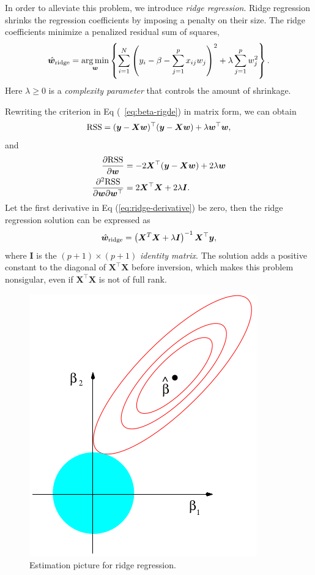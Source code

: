 In order to alleviate this problem, we introduce \emph{ridge regression}. Ridge regression shrinks the regression coefficients by imposing a penalty 
on their size. The ridge coefficients minimize a penalized residual sum of squares,
\begin{equation}\label{eq:beta-rigde}
    \hat{\bm{w}}_{\text{ridge}} = \mathop{\arg\min}_{\bm{w}} \left\{
        \sum_{i=1}^N \left(
            y_i - \beta - \sum_{j=1}^p x_{ij} w_j 
        \right)^2 + \lambda \sum_{j=1}^p w_j^2
    \right\}. 
\end{equation}
Here \(\lambda \ge 0\) is a \emph{complexity parameter} that controls the amount of shrinkage.

Rewriting the criterion in Eq (~\ref{eq:beta-rigde}) in matrix form, we can obtain
\begin{equation}
    \mathrm{RSS} = (\bm{y} - \bm{Xw})^\top (\bm{y} - \bm{Xw}) + \lambda \bm{w}^\top \bm{w},
\end{equation}
and
\begin{equation}\label{eq:ridge-derivative}
    \begin{aligned}
        \pdv{\mathrm{RSS}}{\bm{w}} &= -2\bm{X}^\top (\bm{y} - \bm{Xw}) + 2\lambda\bm{w}\\
        \pdv{\mathrm{RSS}}{\bm{w}}{\bm{w}^\top} &= 2\bm{X}^\top\bm{X} + 2\lambda \bm{I}.
    \end{aligned}
\end{equation}
Let the first derivative in Eq (\ref{eq:ridge-derivative}) be zero, then the ridge regression solution can be expressed as 
\begin{equation}
    \hat{\bm{w}}_{\text{ridge}} = \left( \bm{X}^T \bm{X} + \lambda \bm{I} \right)^{-1} \bm{X}^\top \bm{y},
\end{equation}
where \(\bm{I}\) is the \((p+1) \times (p+1)\) \emph{identity matrix}.
The solution adds a positive constant to the diagonal of \(\bm{X}^\top \bm{X}\) before inversion, which makes this problem
nonsigular, even if \(\bm{X}^\top \bm{X}\) is not of full rank.

\begin{figure}[!htbp]
    \centering
    \includegraphics[scale = 0.4]{fig/ridge-reg.png}
    \caption{Estimation picture for ridge regression.}
    \label{fig:ridge-reg}
\end{figure}